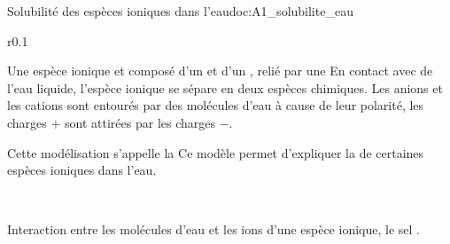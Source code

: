 \begin{doc}{Solubilité des espèces ioniques dans l'eau}{doc:A1_solubilite_eau}
  \begin{wrapfigure}[4]{r}{0.1\linewidth}
    \vspace*{-20pt}
  \end{wrapfigure}
  
  Une espèce ionique et composé d'un  et d'un , relié par une 
  En contact avec de l'eau liquide, l'espèce ionique se sépare en deux espèces chimiques.
  Les anions et les cations sont entourés par des molécules d'eau à cause de leur polarité, les charges $+$ sont attirées par les charges $-$.
  
  Cette modélisation s'appelle la 
  Ce modèle permet d'expliquer la  de certaines espèces ioniques dans l'eau.

  \begin{center}
    ~

    \vspace*{-12pt}
    Interaction entre les molécules d'eau et les ions d'une espèce ionique, le sel .
  \end{center}
\end{doc}


